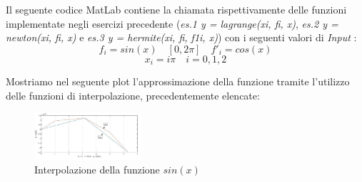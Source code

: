 Il seguente codice MatLab contiene la chiamata rispettivamente delle funzioni implementate negli esercizi precedente (\textit{es.1 y = lagrange(xi, fi, x)}, \textit{es.2 y = newton(xi, fi, x)} e \textit{es.3 y = hermite(xi, fi, f1i, x)}) con i seguenti valori di \textit{Input} : 
	\[
		f_i = sin(x) \quad [0,2\pi] \quad f'_i = cos(x)
	\]
	\[
		x_i = i\pi
		\quad
		i = 0,1,2
	\]

Mostriamo nel seguente plot l'approssimazione della funzione tramite l'utilizzo delle funzioni di interpolazione, precedentemente elencate:
\begin{figure}[H]
	\label{Cap4_Es_4}
	\includegraphics[left, width=150px]{Plot/Cap_4_Es_4}
		\caption{Interpolazione della funzione $sin(x)$}
\end{figure}